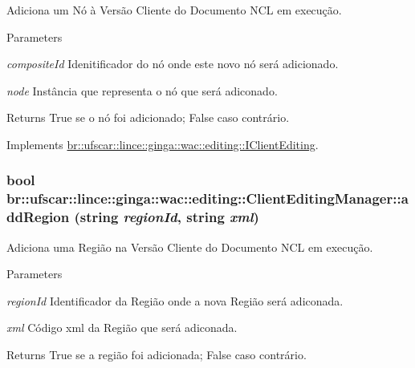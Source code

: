 Adiciona um Nó à Versão Cliente do Documento NCL em execução. 


\begin{DoxyParams}{Parameters}
\item[{\em compositeId}]Idenitificador do nó onde este novo nó será adicionado. \item[{\em node}]Instância que representa o nó que será adiconado. \end{DoxyParams}
\begin{DoxyReturn}{Returns}
True se o nó foi adicionado; False caso contrário. 
\end{DoxyReturn}


Implements \hyperlink{classbr_1_1ufscar_1_1lince_1_1ginga_1_1wac_1_1editing_1_1IClientEditing_ad8662a9f157872a4cbe7ed0da9baf3fb}{br::ufscar::lince::ginga::wac::editing::IClientEditing}.

\hypertarget{classbr_1_1ufscar_1_1lince_1_1ginga_1_1wac_1_1editing_1_1ClientEditingManager_a4f4a856d51b586312be91b376ec0d8f3}{
\subsubsection[{addRegion}]{\setlength{\rightskip}{0pt plus 5cm}bool br::ufscar::lince::ginga::wac::editing::ClientEditingManager::addRegion (string {\em regionId}, \/  string {\em xml})}}
\label{classbr_1_1ufscar_1_1lince_1_1ginga_1_1wac_1_1editing_1_1ClientEditingManager_a4f4a856d51b586312be91b376ec0d8f3}


Adiciona uma Região na Versão Cliente do Documento NCL em execução. 


\begin{DoxyParams}{Parameters}
\item[{\em regionId}]Identificador da Região onde a nova Região será adiconada. \item[{\em xml}]Código xml da Região que será adiconada. \end{DoxyParams}
\begin{DoxyReturn}{Returns}
True se a região foi adicionada; False caso contrário. 
\end{DoxyReturn}


